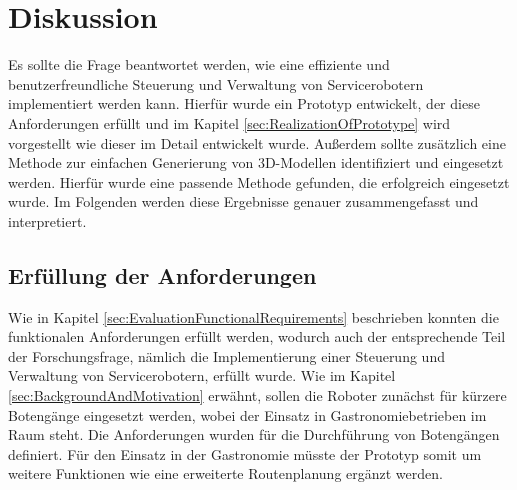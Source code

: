 \newpage
\section{Diskussion}
Es sollte die Frage beantwortet werden, wie eine effiziente und benutzerfreundliche Steuerung und Verwaltung von Servicerobotern implementiert werden kann. Hierfür wurde ein Prototyp entwickelt, der diese Anforderungen erfüllt und im Kapitel \ref{sec:RealizationOfPrototype} wird vorgestellt wie dieser im Detail entwickelt wurde. Außerdem sollte zusätzlich eine Methode zur einfachen Generierung von 3D-Modellen identifiziert und eingesetzt werden. Hierfür wurde eine passende Methode gefunden, die erfolgreich eingesetzt wurde. Im Folgenden werden diese Ergebnisse genauer zusammengefasst und interpretiert.

\subsection{Erfüllung der Anforderungen}
Wie in Kapitel \ref{sec:EvaluationFunctionalRequirements} beschrieben konnten die funktionalen Anforderungen erfüllt werden, wodurch auch der entsprechende Teil der Forschungsfrage, nämlich die Implementierung einer Steuerung und Verwaltung von Servicerobotern, erfüllt wurde. Wie im Kapitel \ref{sec:BackgroundAndMotivation} erwähnt, sollen die Roboter zunächst für kürzere Botengänge eingesetzt werden, wobei der Einsatz in Gastronomiebetrieben im Raum steht. Die Anforderungen wurden für die Durchführung von Botengängen definiert. Für den Einsatz in der Gastronomie müsste der Prototyp somit um weitere Funktionen wie eine erweiterte Routenplanung ergänzt werden.

